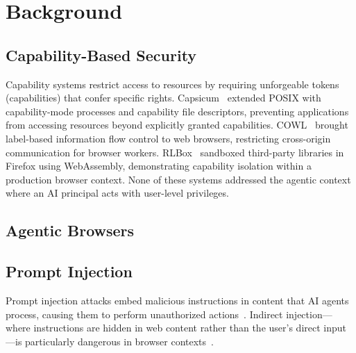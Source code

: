 
\section{Background}
\label{sec:background}

\subsection{Capability-Based Security}

Capability systems restrict access to resources by requiring
unforgeable tokens (capabilities) that confer specific rights.
Capsicum~\cite{watson2010capsicum} extended POSIX with
capability-mode processes and capability file descriptors,
preventing applications from accessing resources beyond
explicitly granted capabilities.
COWL~\cite{stefan2014cowl} brought label-based information
flow control to web browsers, restricting cross-origin
communication for browser workers.
RLBox~\cite{narayan2020rlbox} sandboxed third-party libraries
in Firefox using WebAssembly, demonstrating capability isolation
within a production browser context.
None of these systems addressed the agentic context where
an AI principal acts with user-level privileges.

\subsection{Agentic Browsers}


\subsection{Prompt Injection}

Prompt injection attacks embed malicious instructions in content
that AI agents process, causing them to perform unauthorized
actions~\cite{greshake2023not}.
Indirect injection---where instructions are hidden in web content
rather than the user's direct input---is particularly dangerous
in browser contexts~\cite{nasr2025}.

